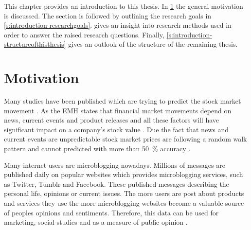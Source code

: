 



This chapter provides an introduction to this thesis.
In \cref{s:introduction-motivation} the general motivation is discussed.
The section is followed by outlining the research goals in \cref{s:introduction-researchgoals}.
 gives an insight into research methods used in order to answer the raised research questions.
Finally, \cref{s:introduction-structureofthisthesis} gives an outlook of the structure of the remaining thesis.

\section{Motivation}
\label{s:introduction-motivation}

Many studies have been published which are trying to predict the stock market movement \citep[see][]{Bollen2011a,Mittal2012a,Nguyen2015a,Pagolu2016a,Zhang2011a}.
As the \ac{EMH} states that financial market movements depend on news, current events and product releases and all these factors will have significant impact on a company's stock value
\citep{fama1965behavior}.
Due the fact that news and current events are unpredictable stock market prices are following a random walk pattern and cannot predicted with more than \SI{50}{\percent} accuracy
\citep{Pagolu2016a}.

Many internet users are microblogging nowadays.
Millions of messages are published daily on popular websites which provides microblogging services, such as Twitter, Tumblr and Facebook.
These published messages describing the personal life, opinions or current issues.
The more users are post about products and services they use the more microblogging websites become a valuable source of peoples opinions and sentiments.
Therefore, this data can be used for marketing, social studies and as a measure of public opinion
\citep{Patodkar2016a, Pagolu2016a}.

